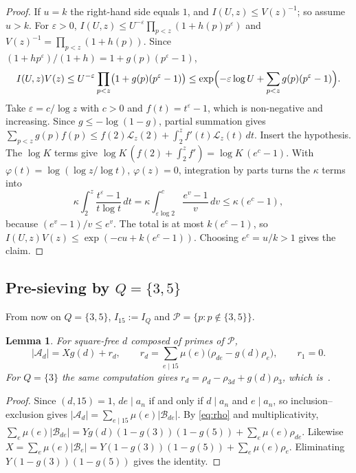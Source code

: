\documentclass[preprint,11pt]{elsarticle}
\newtheorem{lemma}[theorem]{Lemma}
\theoremstyle{definition}
\theoremstyle{remark}
\newcommand{\cA}{\mathcal{A}}
\newcommand{\cB}{\mathcal{B}}
\newcommand{\cP}{\mathcal{P}}
\newcommand{\cL}{\mathcal{L}}
\numberwithin{equation}{section}
\begin{document}
\begin{proof}
If $u=k$ the right-hand side equals $1$, and $I(U,z)\le V(z)^{-1}$; so
assume $u>k$. For $\varepsilon>0$,
$I(U,z)\le U^{-\varepsilon}\prod_{p<z}(1+h(p)p^{\varepsilon})$ and
$V(z)^{-1}=\prod_{p<z}(1+h(p))$. Since
$(1+hp^{\varepsilon})/(1+h)=1+g(p)(p^{\varepsilon}-1)$,
\[
  I(U,z)V(z)\le U^{-\varepsilon}\prod_{p<z}\bigl(1+g(p)(p^{\varepsilon}-1)\bigr)
  \le\exp\Bigl(-\varepsilon\log U+\sum_{p<z}g(p)(p^{\varepsilon}-1)\Bigr).
\]
Take $\varepsilon=c/\log z$ with $c>0$ and $f(t)=t^{\varepsilon}-1$, which is
non-negative and increasing. Since $g\le-\log(1-g)$, partial summation gives
$\sum_{p<z}g(p)f(p)\le f(2)\cL_z(2)+\int_2^zf'(t)\cL_z(t)\,dt$. Insert the
hypothesis. The $\log K$ terms give $\log K\,(f(2)+\int_2^zf')=\log K\,(e^c-1)$.
With $\varphi(t)=\log(\log z/\log t)$, $\varphi(z)=0$, integration by parts
turns the $\kappa$ terms into
\[
  \kappa\int_2^z\frac{t^{\varepsilon}-1}{t\log t}\,dt
  =\kappa\int_{\varepsilon\log2}^{c}\frac{e^v-1}{v}\,dv\le\kappa(e^c-1),
\]
because $(e^v-1)/v\le e^v$. The total is at most $k(e^c-1)$, so
$I(U,z)V(z)\le\exp(-cu+k(e^c-1))$. Choosing $e^c=u/k>1$ gives the claim.
\end{proof}

\subsection{\texorpdfstring{Pre-sieving by $Q=\{3,5\}$}{Pre-sieving by Q=\{3,5\}}}\label{subsec:Q35}

From now on $Q=\{3,5\}$, $I_{15}:=I_Q$ and $\cP=\{p:p\notin\{3,5\}\}$.

\begin{lemma}\label{lem:identity}
For square-free $d$ composed of primes of $\cP$,
\[
  |\cA_d|=Xg(d)+r_d,\qquad
  r_d=\sum_{e\mid15}\mu(e)\bigl(\rho_{de}-g(d)\rho_e\bigr),\qquad r_1=0.
\]
For $Q=\{3\}$ the same computation gives $r_d=\rho_d-\rho_{3d}+g(d)\rho_3$,
which is~\cite[(3.3)]{Campbell2026}.
\end{lemma}

\begin{proof}
Since $(d,15)=1$, $de\mid a_n$ if and only if $d\mid a_n$ and $e\mid a_n$,
so inclusion--exclusion gives $|\cA_d|=\sum_{e\mid15}\mu(e)|\cB_{de}|$. By
\eqref{eq:rho} and multiplicativity,
$\sum_e\mu(e)|\cB_{de}|=Yg(d)(1-g(3))(1-g(5))+\sum_e\mu(e)\rho_{de}$.
Likewise $X=\sum_e\mu(e)|\cB_e|=Y(1-g(3))(1-g(5))+\sum_e\mu(e)\rho_e$.
Eliminating $Y(1-g(3))(1-g(5))$ gives the identity.
\end{proof}
\end{document}
